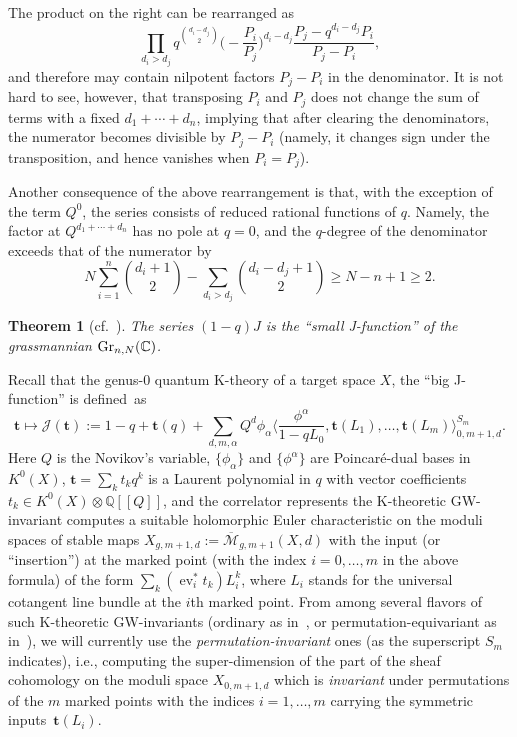 \documentclass[pdftex]{sigma}
\numberwithin{equation}{section}
\newtheorem{Theorem}{Theorem}[section]
\def\J{\mathcal J}
\def\M{{\overline{\mathcal M}}}
\def\QQ{\mathbb Q}
\def\CC{\mathbb C}
\def\a{\alpha}
\def\t{{\mathbf t}}
\def\lan{\langle}
\def\ran{\rangle}
\def\ev{\operatorname{ev}}
\begin{document}
\begin{Remark}\label{rmk1}
The product on the right can be rearranged as
\[
\prod_{d_i>d_j} q^{\binom{d_i-d_j}{2}} \bigg(\!{-}\frac{P_i}{P_j}\bigg)^{d_i-d_j}\frac{P_j-q^{d_i-d_j}P_i}{P_j-P_i},
\]
and therefore may contain nilpotent factors $P_j-P_i$ in the denominator. It is not hard to see, however, that transposing $P_i$ and $P_j$ does not change the sum of terms with a fixed $d_1+\cdots +d_n$, implying that after clearing the denominators, the numerator becomes divisible by $P_j-P_i$ (namely, it changes sign under the transposition, and hence vanishes when $P_i=P_j$).
\end{Remark}

\begin{Remark}\label{rmk2}
Another consequence of the above rearrangement is that, with the exception of the term $Q^0$, the series consists of reduced rational functions of $q$. Namely, the factor at $Q^{d_1+\cdots+d_n}$ has no pole at $q=0$, and the $q$-degree of the denominator exceeds that of the numerator by
\[
N\sum_{i=1}^n\binom{d_i+1}{2}-\sum_{d_i>d_j}\binom{d_i-d_j+1}{2}\geq N-n+1\geq 2.
\]
\end{Remark}

\begin{Theorem}[{cf.~\cite{Taipale, Wen}}]\label{thm1}
The series $(1-q) J$ is the ``small J-function'' of the grassmannian ${\rm Gr}_{n,N}(\CC)$.
\end{Theorem}

Recall that the genus-0 quantum K-theory of a target space $X$, the ``big J-function'' is defi\-ned~as
\[
\t \mapsto \J(\t):=1-q+\t(q)+\sum_{d,m,\a} Q^d \phi_\a \bigg\lan \frac{\phi^\a}{1-qL_0},\t(L_1),\dots,\t(L_m)\bigg\ran_{0,m+1,d}^{S_m}.
\]
Here $Q$ is the Novikov's variable, $\{ \phi_\a \}$ and $\{ \phi^\a\}$ are Poincar{\'e}-dual bases in $K^0(X)$, $\t=\sum_k t_k q^k$ is a Laurent polynomial in $q$ with vector coefficients $t_k \in K^0(X)\otimes \QQ[[Q]]$, and the correlator represents the K-theoretic GW-invariant computes a suitable holomorphic Euler characteristic on the moduli spaces of stable maps $X_{g,m+1,d}:=\M_{g,m+1}(X,d)$ with the input (or ``insertion'') at the marked point (with the index $i=0,\dots,m$ in the above formula) of the form $\sum_k (\ev_i^*t_k) L_i^k$, where $L_i$ stands for the universal cotangent line bundle at the $i$th marked point. From among several flavors of such K-theoretic GW-invariants (ordinary as in~\cite{Givental-Tonita}, or permutation-equivariant as in~\cite{Givental:perm9}), we will currently use the {\em permutation-invariant} ones (as the superscript $S_m$ indicates), i.e., computing the super-dimension of the part of the sheaf cohomology on the moduli space $X_{0,m+1,d}$ which is {\em invariant} under permutations of the $m$ marked points with the indices $i=1,\dots,m$ carrying the symmetric inputs~$\t(L_i)$.
\end{document}
